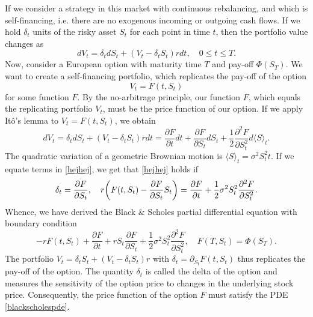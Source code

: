 If we consider a strategy in this market with continuous rebalancing, and which is self-financing, i.e. there are no exogenous incoming or outgoing cash flows. If we hold $\delta_{t}$ units of the risky asset $S_t$ for each point in time $t$, then the portfolio value changes as
\begin{equation}
    dV_{t}=\delta_{t}dS_{t}+(V_{t}-\delta_{t}S_{t})rdt,\quad 0\leq t\leq T.
\end{equation}
Now, consider a European option with maturity time $T$ and pay-off $\Phi(S_{T})$. We want to create a self-financing portfolio, which replicates the pay-off of the option
\begin{equation}
    V_{t}=F(t,S_{t})
\end{equation}
for some function $F$. By the no-arbitrage principle, our function $F$, which equals the replicating portfolio $V_t$, must be the price function of our option. If we apply Itô's lemma to $V_{t}=F(t,S_{t})$, we obtain
\begin{equation}\label{hejhej}
    dV_{t}=\delta_{t}dS_{t}+(V_{t}-\delta_{t}S_{t})rdt=\frac{\partial F}{\partial t}dt+\frac{\partial F}{\partial S_{t}}dS_{t}+\frac{1}{2}\frac{\partial^{2}F}{\partial S_{t}^{2}}d\langle S\rangle_{t}.
\end{equation}
The quadratic variation of a geometric Brownian motion is $\langle S\rangle_{t}=\sigma^{2}S_{t}^{2}t$. If we equate terms in \eqref{hejhej}, we get that \eqref{hejhej} holds if
\begin{equation}
    \delta_{t}=\frac{\partial F}{\partial S_{t}},\hspace{10 pt} r\left(F(t,S_{t})-\frac{\partial F}{\partial S_{t}}S_{t}\right)=\frac{\partial F}{\partial t}+\frac{1}{2}\sigma^{2}S_{t}^{2}\frac{\partial^{2}F}{\partial S_{t}^{2}}.
\end{equation}
Whence, we have derived the Black \& Scholes partial differential equation with boundary condition
\begin{equation}\label{blackscholespde}
    -rF(t,S_{t})+\frac{\partial F}{\partial t}+rS_{t}\frac{\partial F}{\partial S_{t}}+\frac{1}{2}\sigma^{2}S_{t}^{2}\frac{\partial^{2}F}{\partial S_{t}^{2}},\quad F(T,S_{t})=\Phi(S_{T}).
\end{equation}
The portfolio $V_{t}=\delta_{t}S_{t}+(V_{t}-\delta_{t}S_{t})r$ with $\delta_{t}=\partial_{S_{t}}F(t,S_{t})$ thus replicates the pay-off of the option. The quantity $\delta_{t}$ is called the delta of the option and measures the sensitivity of the option price to changes in the underlying stock price. Consequently, the price function of the option $F$ must satisfy the PDE \eqref{blackscholespde}. 

